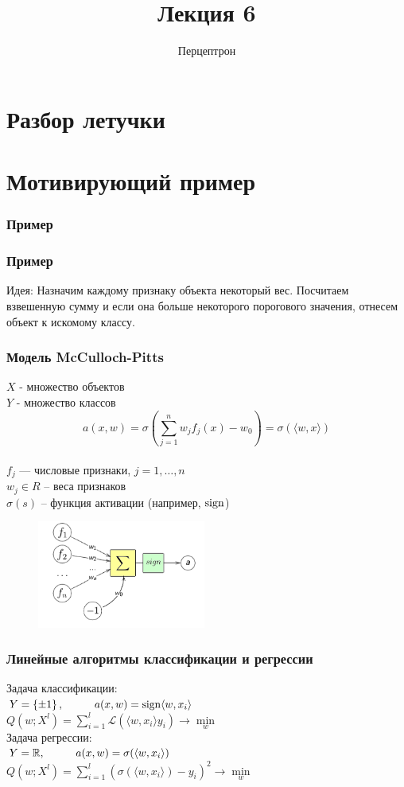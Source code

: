 \documentclass[10pt]{beamer}
\title{Лекция 6}
\subtitle{Перцептрон}
\begin{document}
\maketitle

\section{Разбор летучки}

\section{Мотивирующий пример}

\begin{frame}\frametitle{Пример}
\end{frame}

\begin{frame}\frametitle{Пример}
  \alert{Идея}: Назначим каждому признаку объекта некоторый вес. Посчитаем взвешенную сумму и если она больше некоторого порогового значения, отнесем объект к искомому классу. 
\end{frame}

\begin{frame}\frametitle{Модель McCulloch-Pitts}
  $X$ - множество объектов \\
	$Y$ - множество классов \\
	\pause
	$$a(x,w) = \sigma(\sum\limits_{j=1}^n w_j f_j(x) - w_0) = \sigma(\langle w, x \rangle)$$\\
  $f_j$ — числовые признаки, $j = 1,\dots, n$ \\	
	$w_j \in R$ -- веса признаков\\
	$\sigma(s)$ -- функция активации (например, $\operatorname{sign}$)
	\pause
	\begin{figure}[htbp]
	  \includegraphics[height=100pt, keepaspectratio = true]{images/neuron-scheme}   
	\end{figure}
\end{frame}

\begin{frame}\frametitle{Линейные алгоритмы классификации и регрессии}
	Задача классификации: \\
	$Y = \left\{ \pm1 \right\}, \hspace{10mm} a(x,w) = \sign \langle w, x_i \rangle $\\
	$Q(w;X^l) = \sum\limits_{i=1}^l \mathcal{L} (\langle w, x_i\rangle y_i) \rightarrow \min\limits_w$\\
	\bigbreak
	\pause
	Задача регрессии:\\
	$Y = \mathbb{R}, \hspace{10mm} a(x,w) = \sigma(\langle w, x_i \rangle)$\\
	$Q(w;X^l) = \sum\limits_{i=1}^l (\sigma(\langle w, x_i \rangle) - y_i)^2 \rightarrow \min\limits_w $
\end{frame}
\end{document}
